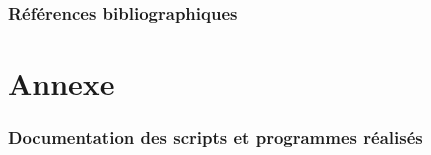 \documentclass[a4paper, 11pt]{article}
\begin{document}
\newpage
\thispagestyle{plain}

\section*{Références bibliographiques}


\nocite{*}
\printbibliography


\appendix
\newpage
{}
\part{Annexe}

\section{Documentation des scripts et programmes réalisés}
\end{document}
